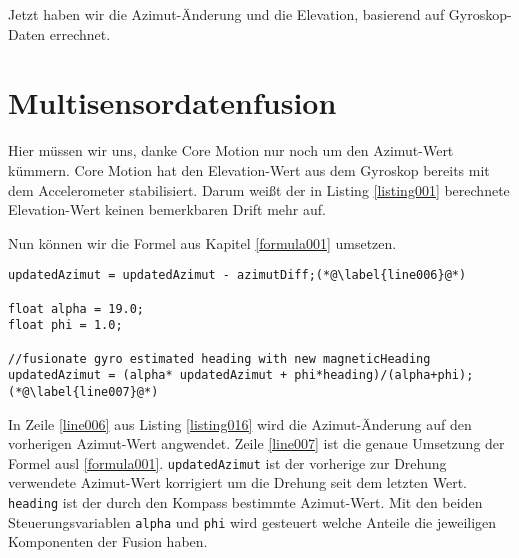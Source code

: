 Jetzt haben wir die Azimut-Änderung und die Elevation, basierend auf Gyroskop-Daten errechnet.

\cite{paper:001} \cite{wiki:007} \cite{mathworks} \cite{book001} \cite{book002}

\section{Multisensordatenfusion}
Hier müssen wir uns, danke Core Motion nur noch um den Azimut-Wert kümmern. Core Motion hat den Elevation-Wert aus dem Gyroskop bereits mit dem Accelerometer stabilisiert. Darum weißt der in Listing \ref{listing001} berechnete Elevation-Wert keinen bemerkbaren Drift mehr auf.

Nun können wir die Formel aus Kapitel \ref{formula001} umsetzen.
~\\
\begin{lstlisting}[float=htb, caption=Eigentliche Datenfusion, label=listing016]
updatedAzimut = updatedAzimut - azimutDiff;(*@\label{line006}@*)

float alpha = 19.0;
float phi = 1.0;

//fusionate gyro estimated heading with new magneticHeading
updatedAzimut = (alpha* updatedAzimut + phi*heading)/(alpha+phi);(*@\label{line007}@*)         
\end{lstlisting}

In Zeile \ref{line006} aus Listing \ref{listing016} wird die Azimut-Änderung auf den vorherigen Azimut-Wert angwendet. Zeile \ref{line007} ist die genaue Umsetzung der Formel ausl \ref{formula001}. \texttt{updatedAzimut} ist der vorherige zur Drehung verwendete Azimut-Wert korrigiert um die Drehung seit dem letzten Wert. \texttt{heading} ist der durch den Kompass bestimmte Azimut-Wert. Mit den beiden Steuerungsvariablen \texttt{alpha} und \texttt{phi} wird gesteuert welche Anteile die jeweiligen Komponenten der Fusion haben.
           
